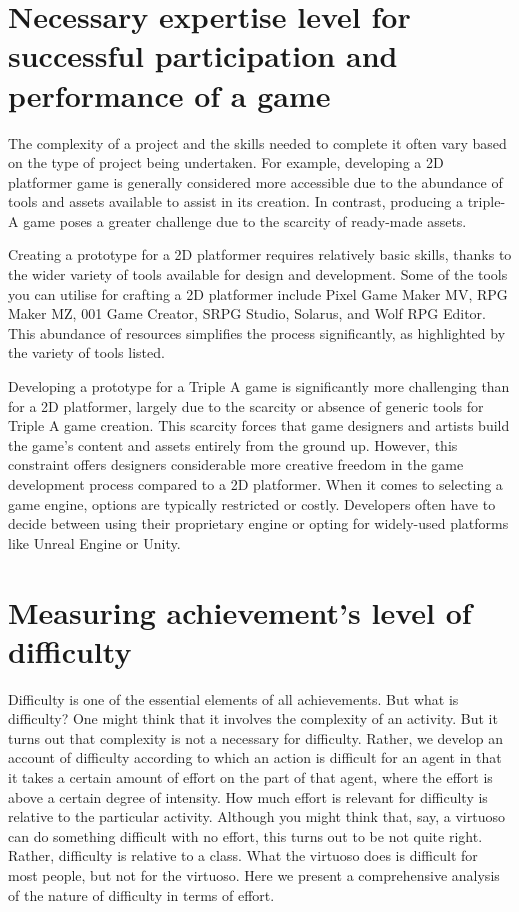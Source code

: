 \documentclass{article}
\begin{document}
\section{Necessary expertise level for successful participation and performance of a game}
The complexity of a project and the skills needed to complete it often vary based on the type of project being undertaken. For example, developing a 2D platformer game is generally considered more accessible due to the abundance of tools and assets available to assist in its creation. In contrast, producing a triple-A game poses a greater challenge due to the scarcity of ready-made assets.


Creating a prototype for a 2D platformer requires relatively basic skills, thanks to the wider variety of tools available for design and development. Some of the tools you can utilise for crafting a 2D platformer include Pixel Game Maker MV, RPG Maker MZ, 001 Game Creator, SRPG Studio, Solarus, and Wolf RPG Editor. This abundance of resources simplifies the process significantly, as highlighted by the variety of tools listed.


Developing a prototype for a Triple A game is significantly more challenging than for a 2D platformer, largely due to the scarcity or absence of generic tools for Triple A game creation. This scarcity forces that game designers and artists build the game's content and assets entirely from the ground up. However, this constraint offers designers considerable more creative freedom in the game development process compared to a 2D platformer. When it comes to selecting a game engine, options are typically restricted or costly. Developers often have to decide between using their proprietary engine or opting for widely-used platforms like Unreal Engine or Unity.


\section{Measuring achievement's level of difficulty}
Difficulty is one of the essential elements of all achievements. But what is difficulty? One might think that it involves the complexity of an activity. But it turns out that complexity is not a necessary for difficulty. Rather, we develop an account of difficulty according to which an action is difficult for an agent in that it takes a certain amount of effort on the part of that agent, where the effort is above a certain degree of intensity. How much effort is relevant for difficulty is relative to the particular activity. Although you might think that, say, a virtuoso can do something difficult with no effort, this turns out to be not quite right. Rather, difficulty is relative to a class. What the virtuoso does is difficult for most people, but not for the virtuoso. Here we present a comprehensive analysis of the nature of difficulty in terms of effort.
\end{document}
